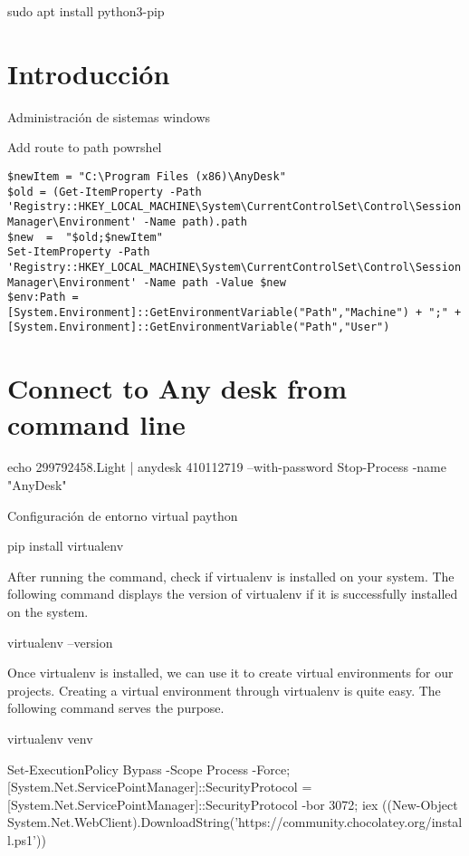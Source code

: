 



sudo apt install python3-pip

\section{Introducción}
Administración de sistemas windows


Add route to path powrshel
\begin{lstlisting}[numbers=none]
$newItem = "C:\Program Files (x86)\AnyDesk"
$old = (Get-ItemProperty -Path 'Registry::HKEY_LOCAL_MACHINE\System\CurrentControlSet\Control\Session Manager\Environment' -Name path).path
$new  =  "$old;$newItem"
Set-ItemProperty -Path 'Registry::HKEY_LOCAL_MACHINE\System\CurrentControlSet\Control\Session Manager\Environment' -Name path -Value $new
$env:Path = [System.Environment]::GetEnvironmentVariable("Path","Machine") + ";" + [System.Environment]::GetEnvironmentVariable("Path","User")
\end{lstlisting}

\section{Connect to Any desk from command line}
echo 299792458.Light | anydesk 410112719 --with-password
Stop-Process -name "AnyDesk"

Configuración de entorno virtual paython


pip install virtualenv

After running the command, check if virtualenv is installed on your system. The following command displays the version of virtualenv if it is successfully installed on the system.

virtualenv –version

Once virtualenv is installed, we can use it to create virtual environments for our projects. Creating a virtual environment through virtualenv is quite easy. The following command serves the purpose.

virtualenv venv

Set-ExecutionPolicy Bypass -Scope Process -Force; [System.Net.ServicePointManager]::SecurityProtocol = [System.Net.ServicePointManager]::SecurityProtocol -bor 3072; iex ((New-Object System.Net.WebClient).DownloadString('https://community.chocolatey.org/install.ps1'))

